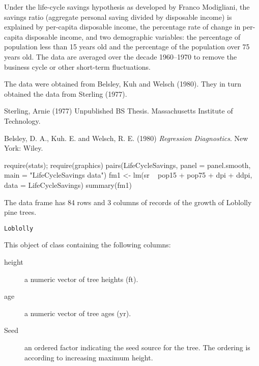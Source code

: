 %
\begin{Details}\relax
Under the life-cycle savings hypothesis as developed by Franco
Modigliani, the savings ratio (aggregate personal saving divided by
disposable income) is explained by per-capita disposable income, the
percentage rate of change in per-capita disposable income, and two
demographic variables: the percentage of population less than 15
years old and the percentage of the population over 75 years old.
The data are averaged over the decade 1960--1970 to remove the
business cycle or other short-term fluctuations. 
\end{Details}
%
\begin{Source}\relax
The data were obtained from Belsley, Kuh and Welsch (1980).
They in turn obtained the data from Sterling (1977).
\end{Source}
%
\begin{References}\relax
Sterling, Arnie (1977) Unpublished BS Thesis.
Massachusetts Institute of Technology.

Belsley, D. A., Kuh. E. and Welsch, R. E. (1980)
\emph{Regression Diagnostics}.
New York: Wiley.
\end{References}
%
\begin{Examples}
\begin{ExampleCode}
require(stats); require(graphics)
pairs(LifeCycleSavings, panel = panel.smooth,
      main = "LifeCycleSavings data")
fm1 <- lm(sr ~ pop15 + pop75 + dpi + ddpi, data = LifeCycleSavings)
summary(fm1)
\end{ExampleCode}
\end{Examples}
%
\begin{Description}\relax
The  data frame has 84 rows and 3 columns of records of
the growth of Loblolly pine trees.
\end{Description}
%
\begin{Usage}
\begin{verbatim}
Loblolly
\end{verbatim}
\end{Usage}
%
\begin{Format}
This object of class  containing the following columns:
\begin{description}

\item[height] 
a numeric vector of tree heights (ft).

\item[age] 
a numeric vector of tree ages (yr).

\item[Seed] 
an ordered factor indicating the seed source for the tree.
The ordering is according to increasing maximum height.


\end{description}

\end{Format}
